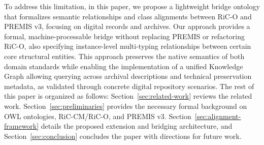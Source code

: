 \documentclass[runningheads]{llncs}
\begin{document}
	To address this limitation, in this paper, we propose a lightweight bridge ontology that formalizes semantic relationships and class alignments between RiC-O and PREMIS v3, focusing on digital records and archives.  
	Our approach provides a formal, machine-processable bridge without replacing PREMIS or refactoring RiC-O, also specifying  instance-level multi-typing relationships between certain core structural entities. This approach preserves the native semantics of both domain standards while enabling the implementation of a unified Knowledge Graph allowing querying across archival descriptions and technical preservation metadata, as validated through concrete digital repository scenarios.
	The rest of this paper is organized as follows: Section~\ref{sec:related-work} reviews the related work. Section~\ref{sec:preliminaries} provides the necessary formal background on OWL ontologies, RiC-CM/RiC-O, and PREMIS v3. 
	Section~\ref{sec:alignment-framework} details the proposed extension and bridging architecture,
	and Section~\ref{sec:conclusion} concludes the paper with directions for future work. 
	
\end{document}
